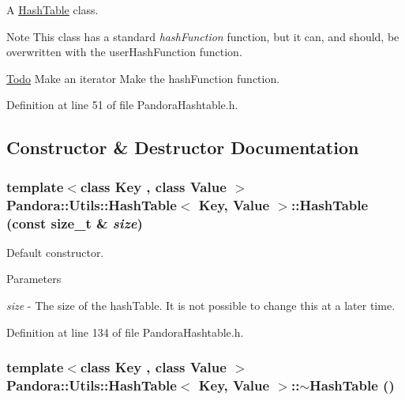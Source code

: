 A \hyperlink{classPandora_1_1Utils_1_1HashTable}{HashTable} class. \begin{DoxyNote}{Note}
This class has a standard {\itshape hashFunction\/} function, but it can, and should, be overwritten with the userHashFunction function. 
\end{DoxyNote}
\begin{Desc}
\item[\hyperlink{todo__todo000001}{Todo}]Make an iterator Make the hashFunction function. \end{Desc}


Definition at line 51 of file PandoraHashtable.h.

\subsection{Constructor \& Destructor Documentation}
\hypertarget{classPandora_1_1Utils_1_1HashTable_a3650951a9de3e61dd2deade67636a0cf}{
\subsubsection[{HashTable}]{\setlength{\rightskip}{0pt plus 5cm}template$<$class Key , class Value $>$ {\bf Pandora::Utils::HashTable}$<$ Key, Value $>$::{\bf HashTable} (const size\_\-t \& {\em size})}}
\label{classPandora_1_1Utils_1_1HashTable_a3650951a9de3e61dd2deade67636a0cf}


Default constructor. 
\begin{DoxyParams}{Parameters}
\item[{\em size}]-\/ The size of the hashTable. It is not possible to change this at a later time. \end{DoxyParams}


Definition at line 134 of file PandoraHashtable.h.\hypertarget{classPandora_1_1Utils_1_1HashTable_adfb815eb2cfe21eca1beffa61be7726d}{
\subsubsection[{$\sim$HashTable}]{\setlength{\rightskip}{0pt plus 5cm}template$<$class Key , class Value $>$ {\bf Pandora::Utils::HashTable}$<$ Key, Value $>$::$\sim${\bf HashTable} ()}}
\label{classPandora_1_1Utils_1_1HashTable_adfb815eb2cfe21eca1beffa61be7726d}


